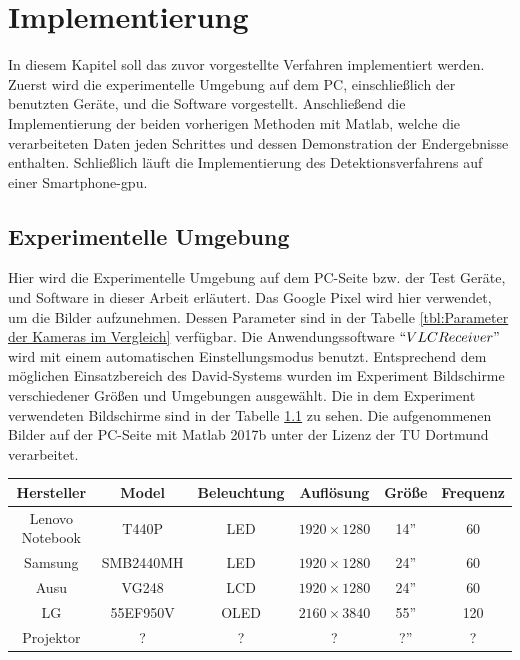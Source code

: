 \chapter{Implementierung} \label{cha:Implementierung}

In diesem Kapitel soll das zuvor vorgestellte Verfahren implementiert werden. Zuerst wird die experimentelle Umgebung auf dem PC, einschließlich der benutzten Geräte, und die Software vorgestellt. Anschließend die Implementierung der beiden vorherigen Methoden mit Matlab, welche die verarbeiteten Daten jeden Schrittes  und dessen Demonstration der Endergebnisse enthalten. Schließlich läuft die Implementierung des Detektionsverfahrens auf einer Smartphone-\gls{gpu}.

\section{Experimentelle Umgebung}

Hier wird die Experimentelle Umgebung auf dem PC-Seite bzw. der Test Geräte, und Software in dieser Arbeit erläutert. Das Google Pixel wird hier verwendet, um die Bilder aufzunehmen. Dessen Parameter sind in der Tabelle \ref{tbl:Parameter der Kameras im Vergleich} verfügbar. Die Anwendungssoftware $ ``VLCReceiver" $ wird mit einem automatischen Einstellungsmodus benutzt. Entsprechend dem möglichen Einsatzbereich des David-Systems wurden im Experiment Bildschirme  verschiedener Größen und Umgebungen ausgewählt. Die in dem Experiment verwendeten Bildschirme sind in der Tabelle \ref{tbl:Verwendeter Bildschirm} zu sehen. Die aufgenommenen Bilder auf der PC-Seite mit Matlab 2017b unter der Lizenz der TU Dortmund verarbeitet.

\begin{table}[htb]
	\label{tbl:Verwendeter Bildschirm}
	\footnotesize
	\centering
	\begin{tabular}{|c|c|c|c|c|c|}
	\toprule
	\textbf{Hersteller} & \textbf{Model} & \textbf{Beleuchtung} & \textbf{Auflösung} & \textbf{Größe}	& \textbf{Frequenz}\\
	\midrule
	Lenovo Notebook & T440P & LED & $ 1920 \times 1280$ & 14'' & 60 \\
	Samsung 	  & SMB2440MH   & LED & $ 1920 \times 1280$ & 24'' & 60 \\
	Ausu  		  & VG248   & LCD & $ 1920 \times 1280$ & 24'' & 60 \\
	LG  		  & 55EF950V & OLED & $ 2160 \times 3840$ & 55'' & 120 \\
	 Projektor & ? & ? & ? & ?'' & ? \\
	
	\bottomrule
	\end{tabular}
\end{table} 

